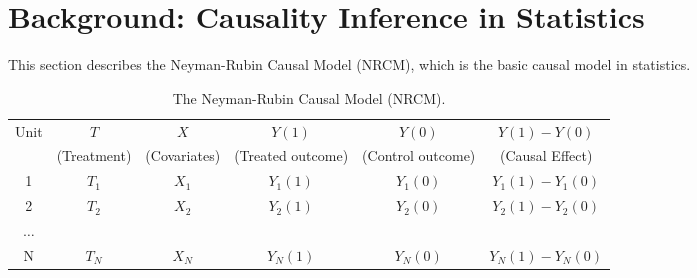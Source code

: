 \vspace{-.1cm}

\section{Background: Causality Inference in Statistics}
\label{subsec:causalitystatistics}





This section describes the Neyman-Rubin Causal Model (NRCM),
which is the basic causal model in statistics.

\begin{table*}[t] \scriptsize
  \centering
  \begin{tabular}{|c|c|c|c|c|c|} \hline
    Unit & $T$           & $X$          & $Y(1)$                & $Y(0)$        &  $Y(1)-Y(0)$ \\
         & (Treatment)   & (Covariates) & (Treated outcome)     & (Control outcome)     & (Causal  Effect)\\
    \hline
    1   & $T_1$ & $X_1$ &  $Y_1(1)$ & $Y_1(0)$ & $Y_1(1) - Y_1(0)$ \\
    2   & $T_2$ & $X_2$ &  $Y_2(1)$ & $Y_2(0)$ & $Y_2(1) - Y_2(0)$ \\
$\ldots$&       &       &  & & \\
    N   & $T_N$ & $X_N$ &  $Y_N(1)$ & $Y_N(0)$ & $Y_N(1) - Y_N(0)$ \\ \hline
  \end{tabular}
  \caption{The Neyman-Rubin Causal Model (NRCM).}
  \label{fig:causal:inference}
\end{table*}


